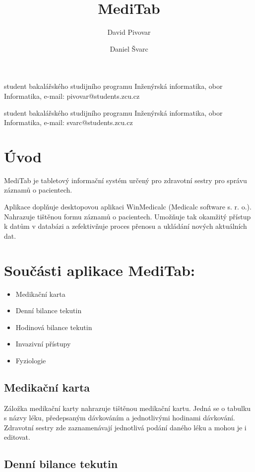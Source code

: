 \documentclass{template_svk}
\begin{document}
\title{MediTab}

 \author{David Pivovar}{student bakalářského studijního programu Inženýrská informatika, obor Informatika, e-mail: pivovar@students.zcu.cz}

 \author{Daniel Švarc}{student bakalářského studijního programu Inženýrská informatika, obor Informatika, e-mail: svarc@students.zcu.cz}

\maketitle


\section{Úvod}

MediTab je tabletový informační systém určený pro zdravotní sestry pro správu záznamů o pacientech.

Aplikace doplňuje desktopovou aplikaci WinMedicalc (Medicalc software s. r. o.). Nahrazuje tištěnou formu záznamů o pacientech. Umožňuje tak okamžitý přístup k datům v databázi a zefektivňuje proces přenosu a ukládání nových aktuálních dat.


\section{Součásti aplikace MediTab:}

\begin{itemize}
	\item Medikační karta
	\item Denní bilance tekutin
	\item Hodinová bilance tekutin
	\item Invazivní přístupy
	\item Fyziologie
\end{itemize}


\subsection{Medikační karta}

Záložka medikační karty nahrazuje tištěnou medikační kartu. Jedná se o tabulku s názvy léku, předepsaným dávkováním a jednotlivými hodinami dávkování. Zdravotní sestry zde zaznamenávají jednotlivá podání daného léku a mohou je i editovat.


\subsection{Denní bilance tekutin}
\end{document}
